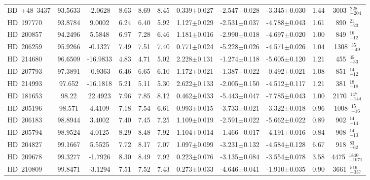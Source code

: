 {\begin{longtable}{lcccccccccc}
BD~+48~3437 & 93.5633 & -2.0628 & 8.63 & 8.69 & 8.45 & 0.339$\pm$0.027 & -2.547$\pm$0.028 & -3.345$\pm$0.030 & 1.44 & 3003~$_{-204}^{228}$ \\
\noalign{\smallskip}
HD~197770 & 93.8784 & 9.0002 & 6.24 & 6.40 & 5.92 & 1.127$\pm$0.029 & -2.531$\pm$0.037 & -4.788$\pm$0.043 & 1.61 & 890~$_{-23}^{21}$ \\
\noalign{\smallskip}
HD~200857 & 94.2496 & 5.5848 & 6.97 & 7.28 & 6.46 & 1.181$\pm$0.016 & -2.990$\pm$0.018 & -4.697$\pm$0.020 & 1.00 & 849~$_{-12}^{16}$ \\
\noalign{\smallskip}
HD~206259 & 95.9266 & -0.1327 & 7.49 & 7.51 & 7.40 & 0.771$\pm$0.024 & -5.228$\pm$0.026 & -4.571$\pm$0.026 & 1.04 & 1308~$_{-49}^{35}$ \\
\noalign{\smallskip}
HD~214680 & 96.6509 & -16.9833 & 4.83 & 4.71 & 5.02 & 2.228$\pm$0.131 & -1.274$\pm$0.118 & -5.605$\pm$0.120 & 1.21 & 455~$_{-33}^{35}$ \\
\noalign{\smallskip}
HD~207793 & 97.3891 & -0.9363 & 6.46 & 6.65 & 6.10 & 1.172$\pm$0.021 & -1.387$\pm$0.022 & -0.492$\pm$0.021 & 1.08 & 851~$_{-12}^{14}$ \\
\noalign{\smallskip}
HD~214993 & 97.652 & -16.1818 & 5.21 & 5.11 & 5.30 & 2.622$\pm$0.133 & -2.005$\pm$0.150 & -4.512$\pm$0.117 & 1.21 & 381~$_{-18}^{18}$ \\
\noalign{\smallskip}
HD~181653 & 98.22 & 22.4923 & 7.96 & 7.85 & 8.12 & 0.462$\pm$0.033 & -5.443$\pm$0.047 & -7.785$\pm$0.043 & 1.00 & 2170~$_{-144}^{147}$ \\
\noalign{\smallskip}
HD~205196 & 98.571 & 4.4109 & 7.18 & 7.54 & 6.61 & 0.993$\pm$0.015 & -3.733$\pm$0.021 & -3.322$\pm$0.018 & 0.96 & 1008~$_{-16}^{15}$ \\
\noalign{\smallskip}
HD~206183 & 98.8944 & 3.4002 & 7.40 & 7.45 & 7.25 & 1.109$\pm$0.019 & -2.591$\pm$0.022 & -5.662$\pm$0.022 & 0.89 & 902~$_{-14}^{14}$ \\
\noalign{\smallskip}
HD~205794 & 98.9524 & 4.0125 & 8.29 & 8.48 & 7.92 & 1.104$\pm$0.014 & -1.466$\pm$0.017 & -4.191$\pm$0.016 & 0.84 & 908~$_{-13}^{14}$ \\
\noalign{\smallskip}
HD~204827 & 99.1667 & 5.5525 & 7.72 & 8.17 & 7.07 & 1.097$\pm$0.099 & -3.231$\pm$0.132 & -4.584$\pm$0.128 & 6.67 & 918~$_{-62}^{83}$ \\
\noalign{\smallskip}
HD~209678 & 99.3277 & -1.7926 & 8.30 & 8.49 & 7.92 & 0.223$\pm$0.076 & -3.135$\pm$0.084 & -3.554$\pm$0.078 & 3.58 & 4475~$_{-1071}^{1840}$ \\
\noalign{\smallskip}
HD~210809 & 99.8471 & -3.1294 & 7.51 & 7.52 & 7.43 & 0.273$\pm$0.033 & -4.646$\pm$0.041 & -1.910$\pm$0.035 & 0.90 & 3661~$_{-337}^{516}$ \\

\end{longtable}}
